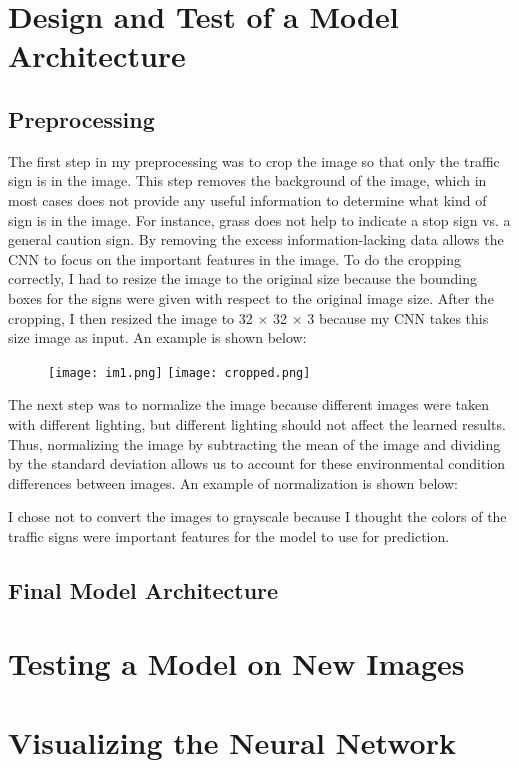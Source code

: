 \documentclass[12pt]{article}
\begin{document}
\section{Design and Test of a Model Architecture}
\subsection{Preprocessing}
The first step in my preprocessing was to crop the image so that only the traffic sign is in the image. This step removes the background of the image, which in most cases does not provide any useful information to determine what kind of sign is in the image. For instance, grass does not help to indicate a stop sign vs. a general caution sign. By removing the excess information-lacking data allows the CNN to focus on the important features in the image. To do the cropping correctly, I had to resize the image to the original size because the bounding boxes for the signs were given with respect to the original image size. After the cropping, I then resized the image to 32 $\times$ 32 $\times$ 3 because my CNN takes this size image as input. An example is shown below:
\begin{figure}[!h]
\texttt{[image: im1.png]}
\texttt{[image: cropped.png]}
\end{figure}

The next step was to normalize the image because different images were taken with different lighting, but different lighting should not affect the learned results. Thus, normalizing the image by subtracting the mean of the image and dividing by the standard deviation allows us to account for these environmental condition differences between images. An example of normalization is shown below:
\begin{figure}[!h]
\end{figure}

I chose not to convert the images to grayscale because I thought the colors of the traffic signs were important features for the model to use for prediction.

\subsection{Final Model Architecture}

\section{Testing a Model on New Images}

\section{Visualizing the Neural Network}



\end{document}
